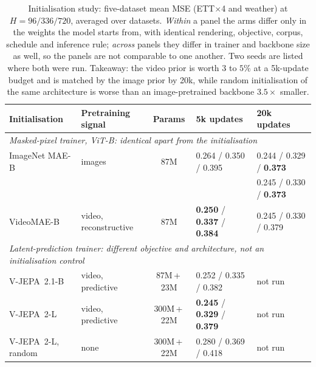 \begin{table}[t]
\caption{Initialisation study: five-dataset mean MSE (ETT$\times$4 and weather) at
$H{=}96/336/720$, averaged over datasets. \emph{Within} a panel the arms differ only in the weights
the model starts from, with identical rendering, objective, corpus, schedule and inference rule;
\emph{across} panels they differ in trainer and backbone size as well, so the panels are not
comparable to one another. Two seeds are listed where both were run. Takeaway: the video prior is
worth $3$ to $5\%$ at a 5k-update budget and is matched by the image prior by 20k, while random
initialisation of the same architecture is worse than an image-pretrained backbone $3.5\times$
smaller.}
\label{tab:backbone}
\begin{center}
\setlength{\tabcolsep}{3pt}
\footnotesize
\begin{tabular}{llcll}
\toprule
Initialisation & Pretraining signal & Params & 5k updates & 20k updates \\
\midrule
\multicolumn{5}{l}{\emph{Masked-pixel trainer, ViT-B: identical apart from the initialisation}} \\
ImageNet MAE-B & images & 87M & 0.264 / 0.350 / 0.395
  & 0.244 / 0.329 / \textbf{0.373} \\
 & & & & 0.245 / 0.330 / \textbf{0.373} \\
VideoMAE-B & video, reconstructive & 87M & \textbf{0.250} / \textbf{0.337} / \textbf{0.384}
  & 0.245 / 0.330 / 0.379 \\
\midrule
\multicolumn{5}{l}{\emph{Latent-prediction trainer: different objective and architecture, not an initialisation control}} \\[1pt]
V-JEPA~2.1-B & video, predictive & 87M\,+\,23M & 0.252 / 0.335 / 0.382 & not run \\
V-JEPA~2-L & video, predictive & 300M\,+\,22M & \textbf{0.245} / \textbf{0.329} / \textbf{0.379} & not run \\
V-JEPA~2-L, random & none & 300M\,+\,22M & 0.280 / 0.369 / 0.418 & not run \\
\bottomrule
\end{tabular}
\end{center}
\end{table}

